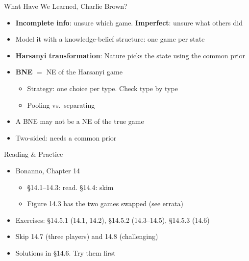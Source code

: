 \begin{frame}{What Have We Learned, Charlie Brown?}
\begin{itemize}
    \item \textbf{Incomplete info}: unsure which game. \textbf{Imperfect}: unsure what others did
    \item Model it with a knowledge-belief structure: one game per state
    \item \textbf{Harsanyi transformation}: Nature picks the state using the common prior
    \item \textbf{BNE} $=$ NE of the Harsanyi game
    \begin{itemize}
        \item Strategy: one choice per type. Check type by type
        \item Pooling vs.\ separating
    \end{itemize}
    \item A BNE may not be a NE of the true game
    \item Two-sided: needs a common prior
\end{itemize}
\vfill
\vspace{-0.4in}
\end{frame}

\begin{frame}{Reading \& Practice}
\begin{itemize}
    \item Bonanno, Chapter 14
    \begin{itemize}
        \item \S14.1--14.3: read. \S14.4: skim
        \item Figure 14.3 has the two games swapped (see errata)
    \end{itemize}
    \item Exercises: \S14.5.1 (14.1, 14.2), \S14.5.2 (14.3--14.5), \S14.5.3 (14.6)
    \item Skip 14.7 (three players) and 14.8 (challenging)
    \item Solutions in \S14.6. Try them first
\end{itemize}
\vfill
\end{frame}


